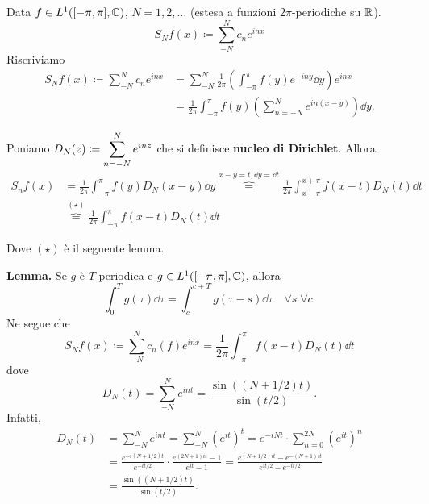 Data $f \in L^1([-\pi,\pi], \mathbb C) $, $N = 1,2,\ldots$ (estesa a funzioni $2\pi$-periodiche su $\mathbb R$).
%
$$
S_N f(x) \coloneqq \sum_{-N}^N c_n e^{inx}  
$$
%
Riscriviamo
%
\begin{align*}
S_N f(x) \coloneqq \sum_{-N}^N c_n e^{inx} 
& = \sum_{-N}^N \frac{1}{2\pi} \left( \int_{-\pi}^\pi f(y) e^{-iny} \dd y \right) e^{inx} \\
& = \frac{1}{2\pi} \int_{-\pi}^\pi f(y) \left( \sum_{n=-N}^{N} e^{in(x-y)}  \right) \dd y.
\end{align*}

Poniamo $\displaystyle D_N(z) \coloneqq \sum_{n=-N}^{N} e^{inz} $ che si definisce \textbf{nucleo di Dirichlet}. Allora
%
\begin{align*}
S_n f(x) & = \frac{1}{2\pi} \int_{-\pi}^\pi f(y) D_N(x-y) \dd y \overbrace{=}^{x-y=t, \dd y = \dd t} \frac{1}{2\pi} \int_{x-\pi}^{x+\pi} f(x-t) D_N(t) \dd t \\
& \overbrace{=}^{(\star)} \frac{1}{2\pi} \int_{-\pi}^\pi f(x-t) D_N(t) \dd t 
\end{align*}

Dove $(\star)$ è il seguente lemma.

\textbf{Lemma.} Se $g$ è $T$-periodica e $g \in L^1([-\pi,\pi], \mathbb C) $, allora
%
$$
\int_0^T g(\tau) \dd \tau = \int_c^{c+T} g(\tau-s) \dd \tau \quad \forall s \; \forall c.
$$
%
Ne segue che
%
$$
S_N f(x) \coloneqq \sum_{-N}^{N} c_n(f) e^{inx} = \frac{1}{2\pi} \int_{-\pi}^\pi f(x-t) D_N(t) \dd t 
$$
%
dove
%
$$
D_N(t) = \sum_{-N}^{N} e^{int} = \frac{\sin( (N+ 1/2)t)}{\sin(t/2)}.
$$
%
Infatti,
%
\begin{align*}
D_N(t) & = \sum_{-N}^N e^{int} = \sum_{-N}^N ( e^{it} )^t = e^{-iNt} \cdot \sum_{n=0}^{2N} ( e^{it} )^n \\
& = \frac{e^{-i(N + 1/2)t}}{e^{-i t/2}} \cdot \frac{e^{(2N+1) it} - 1}{e^{it} - 1} = \frac{e^{(N+1/2)it} - e^{-(N+1)it}}{e^{i t/2} - e^{-i t/2}} \\
& = \frac{\sin ( (N+1/2)t)}{\sin(t/2)}.
\end{align*}

